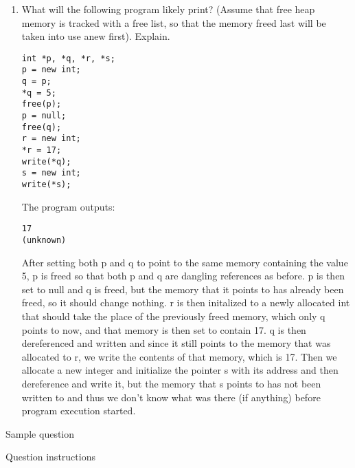\documentclass[11pt]{exam}
\begin{document}
\begin{questions}
\begin{enumerate}[label=(\roman*)]
            \item What will the following program likely print? (Assume that free heap memory is tracked with a free list, so that the memory freed last will be taken into use anew first). Explain.
                \begin{lstlisting}
int *p, *q, *r, *s;
p = new int;
q = p;
*q = 5;
free(p);
p = null;
free(q);
r = new int;
*r = 17;
write(*q);
s = new int;
write(*s);
                \end{lstlisting}

                \begin{framed}
                     The program outputs:
                    \begin{lstlisting}
17
(unknown)
                    \end{lstlisting}
                    After setting both p and q to point to the same memory containing the value 5, p is freed so that both p and q are dangling references as before. p is then set to null and q is freed, but the memory that it points to has already been freed, so it should change nothing. r is then initalized to a newly allocated int that should take the place of the previously freed memory, which only q points to now, and that memory is then set to contain 17. q is then dereferenced and written and since it still points to the memory that was allocated to r, we write the contents of that memory, which is 17. Then we allocate a new integer and initialize the pointer s with its address and then dereference and write it, but the memory that s points to has not been written to and thus we don't know what was there (if anything) before program execution started.
                \end{framed}
        
        \end{enumerate}


	\question Sample question


	\quad

	Question instructions

	\begin{framed}

	\end{framed}

\end{questions}
\end{document}
